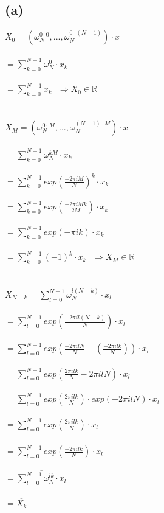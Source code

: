 \documentclass[12pt]{article}
\begin{document}
\subsection*{(a)}
$X_{0}=(\omega^{0\cdot0}_{N},...,\omega^{0\cdot(N-1)}_{N})\cdot x$\\\\
$=\sum^{N-1}_{k=0} \omega^{0}_{N}\cdot x_{k}$\\\\
$=\sum^{N-1}_{k=0} x_{k} ~~~\Rightarrow X_{0} \in \mathbb{R}$\\\\\\
$X_{M}=(\omega^{0\cdot M}_{N},...,\omega^{(N-1)\cdot M}_{N})\cdot x$\\\\
$=\sum^{N-1}_{k=0} \omega^{kM}_{N}\cdot x_{k}$\\\\
$=\sum^{N-1}_{k=0} exp(\frac{-2\pi iM}{N})^{k}\cdot x_{k}$\\\\
$=\sum^{N-1}_{k=0} exp(\frac{-2\pi iMk}{2M})\cdot x_{k}$\\\\
$=\sum^{N-1}_{k=0} exp(-\pi ik)\cdot x_{k}$\\\\
$=\sum^{N-1}_{k=0} (-1)^{k}\cdot x_{k} ~~~\Rightarrow X_{M} \in \mathbb{R}$\\\\\\
$X_{N-k}=\sum^{N-1}_{l=0} \omega^{l(N-k)}_{N}\cdot x_{l}$\\\\
$=\sum^{N-1}_{l=0} exp(\frac{-2\pi il(N-k)}{N})\cdot x_{l}$\\\\
$=\sum^{N-1}_{l=0} exp(\frac{-2\pi ilN}{N}-(\frac{-2\pi ilk}{N}))\cdot x_{l}$\\\\
$=\sum^{N-1}_{l=0} exp(\frac{2\pi ilk}{N}-2\pi ilN)\cdot x_{l}$\\\\
$=\sum^{N-1}_{l=0} exp(\frac{2\pi ilk}{N})\cdot exp(-2\pi ilN)\cdot x_{l}$\\\\
$=\sum^{N-1}_{l=0} exp(\frac{2\pi ilk}{N})\cdot x_{l}$\\\\
$=\overline{\sum^{N-1}_{l=0} exp(\frac{-2\pi ilk}{N})\cdot x_{l}}$\\\\
$=\overline{\sum^{N-1}_{l=0} \omega^{lk}_{N}\cdot x_{l}}$\\\\
$=\overline{X_{k}}$
\end{document}
